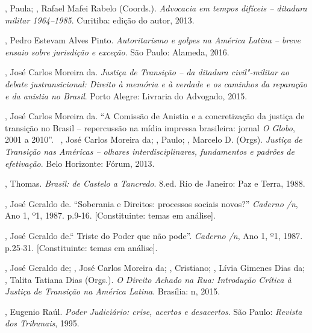 , Paula; , Rafael Mafei Rabelo (Coords.).
\emph{Advocacia em tempos difíceis -- ditadura militar 1964--1985}.
Curitiba: edição do autor, 2013.

, Pedro Estevam Alves Pinto. \emph{Autoritarismo e golpes na
América Latina -- breve ensaio sobre jurisdição e exceção}. São Paulo:
Alameda, 2016.

 , José Carlos Moreira da. \emph{Justiça de Transição -- da
ditadura civil"-militar ao debate justransicional: Direito à memória e à
verdade e os caminhos da reparação e da anistia no Brasil}. Porto Alegre:
Livraria do Advogado, 2015.

 , José Carlos Moreira da. ``A Comissão de Anistia e a
concretização da justiça de transição no Brasil -- repercussão na mídia
impressa brasileira: jornal \emph{O Globo}, 2001 a 2010''.~ , José
Carlos Moreira da; , Paulo; , Marcelo D. (Orgs).
\emph{Justiça de Transição nas Américas -- olhares interdisciplinares,
fundamentos e padrões de efetivação}. Belo Horizonte: Fórum, 2013.

, Thomas. \emph{Brasil: de Castelo a Tancredo}. 8.ed. Rio de
Janeiro: Paz e Terra, 1988.

 , José Geraldo de.
``Soberania e Direitos: processos sociais
novos?'' \emph{Caderno /n}, Ano 1, º1,
1987. p.9-16. {[}Constituinte: temas em análise{]}.

 , José Geraldo de.`` Triste do Poder que não pode''.
\emph{Caderno /n}, Ano 1, º1, 1987. p.25-31. {[}Constituinte:
temas em análise{]}.

 , José Geraldo de;  , José Carlos Moreira da;
, Cristiano; , Lívia Gimenes Dias da; , Talita
Tatiana Dias (Orgs.). \emph{O Direito Achado na Rua: Introdução
Crítica à Justiça de Transição na América Latina}. Brasília: n, 2015.

, Eugenio Raúl. \emph{Poder Judiciário: crise, acertos e
desacertos}. São Paulo: \emph{Revista dos Tribunais}, 1995.
